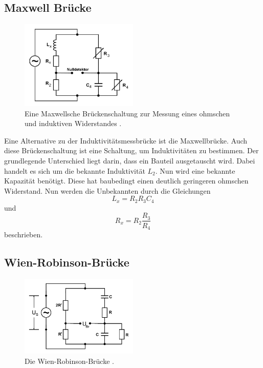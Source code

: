 \subsection{Maxwell Brücke}
\begin{figure}
    \centering
    \includegraphics[width=0.5\textwidth]{pictures/schaltung5.pdf}
    \caption{Eine Maxwellsche Brückenschaltung zur Messung eines ohmschen und induktiven Widerstandes \cite[7]{v302}.}
    \label{fig:Schaltung5}
\end{figure}

Eine Alternative zu der Induktivitätsmessbrücke ist die Maxwellbrücke.
Auch diese Brückenschaltung ist eine Schaltung, um Induktivitäten zu bestimmen.
Der grundlegende Unterschied liegt darin, dass ein Bauteil ausgetauscht wird.
Dabei handelt es sich um die bekannte Induktivität $L_2$.
Nun wird eine bekannte Kapazität benötigt.
Diese hat baubedingt einen deutlich geringeren ohmschen Widerstand.
Nun werden die Unbekannten durch die Gleichungen
\begin{equation} \label{eq:maxwL_x}
    L_x = R_2 R_3 C_4
\end{equation}
und 
\begin{equation*}
    R_x = R_2 \frac{R_3}{R_4}
\end{equation*}
beschrieben.

\subsection{Wien-Robinson-Brücke}

\begin{figure}
    \centering
    \includegraphics[width=0.5\textwidth]{pictures/schaltung6.pdf}
    \caption{Die Wien-Robinson-Brücke \cite[8]{v302}.}
    \label{fig:Schaltung6}
\end{figure}

